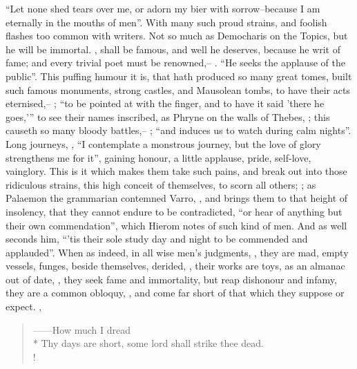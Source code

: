 \enquote{Let none shed tears over me, or adorn my bier with sorrow--because I am
eternally in the mouths of men}. With many such proud strains, and foolish
flashes too common with writers. Not so much as Democharis on the
Topics, but he will be immortal. ,
shall be famous, and well he deserves, because he writ of fame; and every
trivial poet must be renowned,-- . \enquote{He
seeks the applause of the public}. This puffing humour it is, that hath
produced so many great tomes, built such famous monuments, strong castles, and
Mausolean tombs, to have their acts eternised,-- ; \enquote{to be pointed at with the finger, and to have it said 'there
he goes,'} to see their names inscribed, as Phryne on the walls of Thebes,
; this causeth so many bloody battles,-- ; \enquote{and induces us to watch during calm nights}. Long journeys,
, \enquote{I contemplate a monstrous
journey, but the love of glory strengthens me for it}, gaining honour, a little
applause, pride, self-love, vainglory. This is it which makes them take such
pains, and break out into those ridiculous strains, this high conceit of
themselves, to scorn all others; ; as Palaemon the grammarian
contemned Varro, , and brings
them to that height of insolency, that they cannot endure to be contradicted,
\enquote{or hear of anything but their own commendation}, which
Hierom notes of such kind of men. And as \Austin{} well
seconds him, \enquote{'tis their sole study day and night to be commended and
applauded}. When as indeed, in all wise men's judgments, ,
they are mad, empty vessels, funges, beside themselves,
derided, , their works are toys, as an almanac out of
date, , they seek
fame and immortality, but reap dishonour and infamy, they are a common obloquy,
, and come far short of that which they suppose or expect.
,

\begin{verse}%
------How much I dread\\*
Thy days are short, some lord shall strike thee dead.\\!
\end{verse}%

